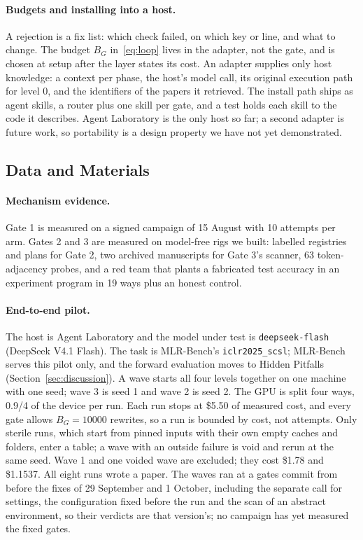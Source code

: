 \documentclass[sigconf,anonymous]{aamas}
\begin{document}
\paragraph{Budgets and installing into a host.}
A rejection is a fix list: which check failed, on which key or line, and what to change.
The budget $B_G$ in~\eqref{eq:loop} lives in the adapter, not the gate, and is chosen at setup after the layer states its cost.
An adapter supplies only host knowledge: a context per phase, the host's model call, its original execution path for level 0, and the identifiers of the papers it retrieved.
The install path ships as agent skills, a router plus one skill per gate, and a test holds each skill to the code it describes.
Agent Laboratory is the only host so far; a second adapter is future work, so portability is a design property we have not yet demonstrated.

\subsection{Data and Materials}
\label{sec:evaldesign}

\paragraph{Mechanism evidence.}
Gate 1 is measured on a signed campaign of 15 August with 10 attempts per arm.
Gates 2 and 3 are measured on model-free rigs we built: labelled registries and plans for Gate 2, two archived manuscripts for Gate 3's scanner, 63 token-adjacency probes, and a red team that plants a fabricated test accuracy in an experiment program in 19 ways plus an honest control.

\paragraph{End-to-end pilot.}
The host is Agent Laboratory and the model under test is \texttt{deepseek-flash} (DeepSeek V4.1 Flash).
The task is MLR-Bench's \texttt{iclr2025\_scsl}; MLR-Bench serves this pilot only, and the forward evaluation moves to Hidden Pitfalls (Section~\ref{sec:discussion}).
A wave starts all four levels together on one machine with one seed; wave 3 is seed 1 and wave 2 is seed 2.
The GPU is split four ways, 0.9/4 of the device per run.
Each run stops at \$5.50 of measured cost, and every gate allows $B_G = 10000$ rewrites, so a run is bounded by cost, not attempts.
Only sterile runs, which start from pinned inputs with their own empty caches and folders, enter a table; a wave with an outside failure is void and rerun at the same seed.
Wave 1 and one voided wave are excluded; they cost \$1.78 and \$1.1537.
All eight runs wrote a paper.
The waves ran at a gates commit from before the fixes of 29 September and 1 October, including the separate call for settings, the configuration fixed before the run and the scan of an abstract environment, so their verdicts are that version's; no campaign has yet measured the fixed gates.
\end{document}
